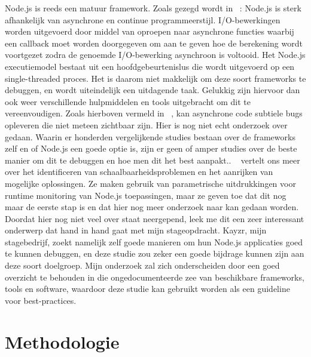 Node.js is reeds een matuur framework. Zoals gezegd wordt in ~\autocite{Runtime2017}: Node.js is sterk afhankelijk van asynchrone en continue programmeerstijl. I/O-bewerkingen worden uitgevoerd door middel van oproepen naar asynchrone functies waarbij een callback moet worden doorgegeven om aan te geven hoe de berekening wordt voortgezet zodra de genoemde I/O-bewerking asynchroon is voltooid. Het Node.js executiemodel bestaat uit een hoofdgebeurtenislus die wordt uitgevoerd op een single-threaded proces.
Het is daarom niet makkelijk om deze soort frameworks te debuggen, en wordt uiteindelijk een uitdagende taak. Gelukkig zijn hiervoor dan ook weer verschillende hulpmiddelen en tools uitgebracht om dit te vereenvoudigen. Zoals hierboven vermeld in ~\autocite{Runtime2017}, kan asynchrone code subtiele bugs opleveren die niet meteen zichtbaar zijn.  Hier is nog niet echt onderzoek over gedaan. Waarin er honderden vergelijkende studies bestaan over de frameworks zelf en of Node.js een goede optie is, zijn er geen of amper studies over de beste manier om dit te debuggen en hoe men dit het best aanpakt.. ~\autocite{Runtime2017} vertelt ons meer over  het identificeren van schaalbaarheidsproblemen en het aanrijken van mogelijke oplossingen. Ze maken gebruik van parametrische uitdrukkingen voor runtime monitoring van Node.js toepassingen, maar ze geven toe dat dit nog maar de eerste stap is en dat hier nog meer onderzoek naar kan gedaan worden. Doordat hier nog niet veel over staat neergepend, leek me dit een zeer interessant onderwerp dat hand in hand gaat met mijn stageopdracht. Kayzr, mijn stagebedrijf, zoekt namelijk zelf goede manieren om hun Node.js applicaties goed te kunnen debuggen, en deze studie zou zeker een goede bijdrage kunnen zijn aan deze soort doelgroep. Mijn onderzoek zal zich onderscheiden door een goed overzicht te behouden in die ongedocumenteerde zee van beschikbare frameworks, tools en software, waardoor deze studie kan gebruikt worden als een guideline voor best-practices. 



\section{Methodologie}
\label{sec:methodologie}

